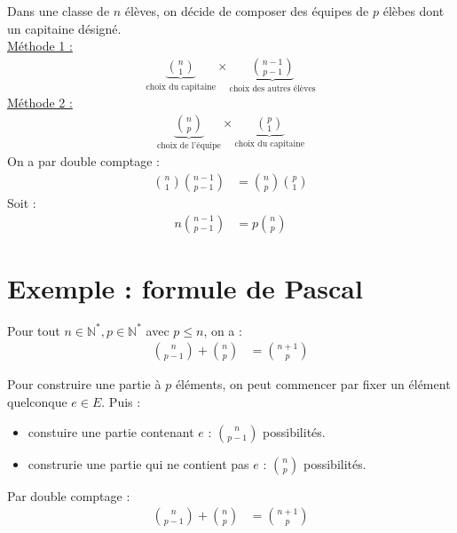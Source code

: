 \documentclass[../main.tex]{subfiles}
\begin{document}
\noindent Dans une classe de $n$ élèves, on décide de composer des équipes de $p$ élèbes dont un capitaine désigné. \\
\underline{Méthode 1 :} \\
\begin{align*}
    \underbrace{\binom{n}{1}}_{\text{choix du capitaine}}\times \underbrace{\binom{n-1}{p-1}}_{\text{choix des autres élèves}}
\end{align*}
\underline{Méthode 2 :} \\
\begin{align*}
    \underbrace{\binom{n}{p}}_{\text{choix de l'équipe}}\times \underbrace{\binom{p}{1}}_{\text{choix du capitaine}}
\end{align*}
On a par double comptage :
\begin{align*}
    \binom{n}{1} \binom{n-1}{p-1} &= \binom{n}{p} \binom{p}{1}
\end{align*}
Soit : 
\begin{align*}
    n\binom{n-1}{p-1} &= p\binom{n}{p}
\end{align*}

\section{Exemple : formule de Pascal}
\begin{tcolorbox}[title=Exemple 31.53, title filled=false, colframe=darkgreen, colback=darkgreen!10!white]
    Pour tout $n\in \mathbb{N}^*, p\in \mathbb{N}^*$ avec $p\leq n$, on a : 
    \begin{align*}
        \binom{n}{p-1} + \binom{n}{p} &= \binom{n+1}{p}
    \end{align*}
\end{tcolorbox}

\noindent Pour construire une partie à $p$ éléments, on peut commencer par fixer un élément quelconque $e\in E$. Puis : 
\begin{itemize}
    \item constuire une partie contenant $e$ : $\binom{n}{p-1}$ possibilités.
    \item construrie une partie qui ne contient pas $e$ : $\binom{n}{p}$ possibilités.
\end{itemize}
Par double comptage : 
\begin{align*}
    \binom{n}{p-1} + \binom{n}{p} &= \binom{n+1}{p}
\end{align*}
\end{document}
